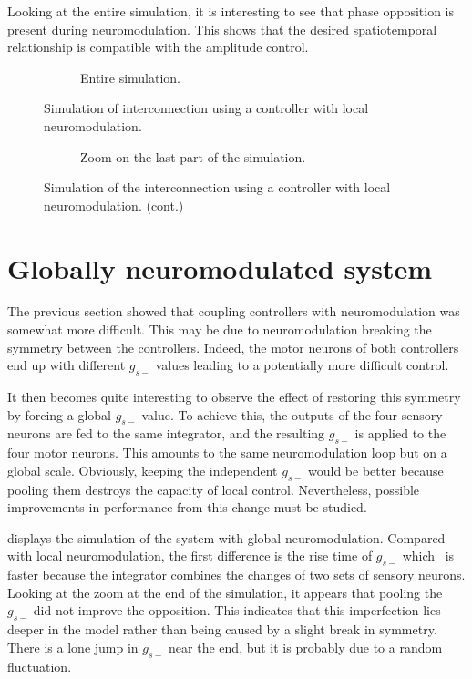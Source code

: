 Looking at the entire simulation, it is interesting to see that phase opposition is present during neuromodulation.
This shows that the desired spatiotemporal relationship is compatible with the amplitude control.

\begin{figure}[!b]
    \centering
    \begin{subfigure}[t]{\textwidth}
        \centering
        \caption{Entire simulation.}
    \end{subfigure}
    \caption{Simulation of interconnection using a controller with local neuromodulation.}
    \label{fig:hco_mod}
\end{figure}

\begin{figure}[!t]\ContinuedFloat
    \centering
    \begin{subfigure}[b]{\textwidth}
        \centering
        \caption{Zoom on the last part of the simulation.}
    \end{subfigure}
    \caption[]{Simulation of the interconnection using a controller with local neuromodulation. (cont.)}
    \label{fig:hco_mod2}
\end{figure}

\section{Globally neuromodulated system}

The previous section showed that coupling controllers with neuromodulation was somewhat more difficult.
This may be due to neuromodulation breaking the symmetry between the controllers.
Indeed, the motor neurons of both controllers end up with different $g_{s-}$ values leading to a potentially more difficult control.
 
It then becomes quite interesting to observe the effect of restoring this symmetry by forcing a global $g_{s-}$ value.
To achieve this, the outputs of the four sensory neurons are fed to the same integrator, and the resulting $g_{s-}$ is applied to the four motor neurons.
This amounts to the same neuromodulation loop but on a global scale.
Obviously, keeping the independent $g_{s-}$ would be better because pooling them destroys the capacity of local control.
Nevertheless, possible improvements in performance from this change must be studied.

 displays the simulation of the system with global neuromodulation.
Compared with local neuromodulation, the first difference is the rise time of $g_{s-}$ which  is faster because the integrator combines the changes of two sets of sensory neurons.
Looking at the zoom at the end of the simulation, it appears that pooling the $g_{s-}$ did not improve the opposition.
This indicates that this imperfection lies deeper in the model rather than being caused by a slight break in symmetry.
There is a lone jump in $g_{s-}$ near the end, but it is probably due to a random fluctuation.

